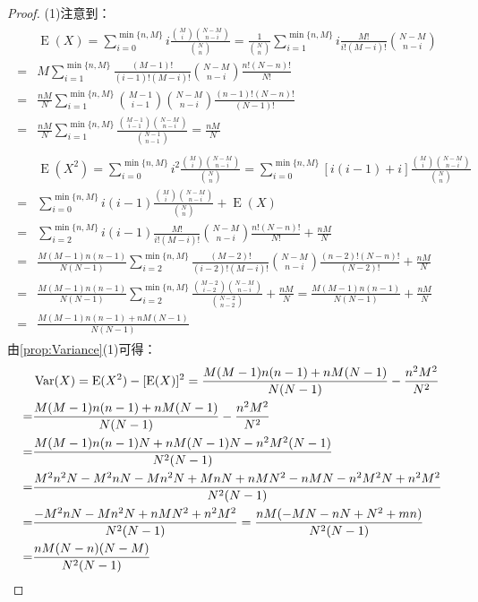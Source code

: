 \begin{proof}
	(1)注意到：
	\begin{gather*}
		\begin{aligned}
			&\operatorname{E}(X)=\sum_{i=0}^{\min\{n,M\}}i\frac{\binom{M}{i}\binom{N-M}{n-i}}{\binom{N}{n}}=\frac{1}{\binom{N}{n}}\sum_{i=1}^{\min\{n,M\}}i\frac{M!}{i!(M-i)!}\binom{N-M}{n-i} \\
			=&M\sum_{i=1}^{\min\{n,M\}}\frac{(M-1)!}{(i-1)!(M-i)!}\binom{N-M}{n-i}\frac{n!(N-n)!}{N!} \\
			=&\frac{nM}{N}\sum_{i=1}^{\min\{n,M\}}\binom{M-1}{i-1}\binom{N-M}{n-i}\frac{(n-1)!(N-n)!}{(N-1)!} \\
			=&\frac{nM}{N}\sum_{i=1}^{\min\{n,M\}}\frac{\binom{M-1}{i-1}\binom{N-M}{n-i}}{\binom{N-1}{n-1}}=\frac{nM}{N}
		\end{aligned} \\
		\begin{aligned}
			&\operatorname{E}(X^2)=\sum_{i=0}^{\min\{n,M\}}i^2\frac{\binom{M}{i}\binom{N-M}{n-i}}{\binom{N}{n}}=\sum_{i=0}^{\min\{n,M\}}[i(i-1)+i]\frac{\binom{M}{i}\binom{N-M}{n-i}}{\binom{N}{n}} \\
			=&\sum_{i=0}^{\min\{n,M\}}i(i-1)\frac{\binom{M}{i}\binom{N-M}{n-i}}{\binom{N}{n}}+\operatorname{E}(X) \\
			=&\sum_{i=2}^{\min\{n,M\}}i(i-1)\frac{M!}{i!(M-i)!}\binom{N-M}{n-i}\frac{n!(N-n)!}{N!}+\frac{nM}{N} \\
			=&\frac{M(M-1)n(n-1)}{N(N-1)}\sum_{i=2}^{\min\{n,M\}}\frac{(M-2)!}{(i-2)!(M-i)!}\binom{N-M}{n-i}\frac{(n-2)!(N-n)!}{(N-2)!}+\frac{nM}{N} \\
			=&\frac{M(M-1)n(n-1)}{N(N-1)}\sum_{i=2}^{\min\{n,M\}}\frac{\binom{M-2}{i-2}\binom{N-M}{n-i}}{\binom{N-2}{n-2}}+\frac{nM}{N}=\frac{M(M-1)n(n-1)}{N(N-1)}+\frac{nM}{N} \\
			=&\frac{M(M-1)n(n-1)+nM(N-1)}{N(N-1)}
		\end{aligned}
	\end{gather*}
	由\cref{prop:Variance}(1)可得：
	\begin{align*}
		&\operatorname{Var}(X)=\operatorname{E}(X^2)-[\operatorname{E}(X)]^2=\frac{M(M-1)n(n-1)+nM(N-1)}{N(N-1)}-\frac{n^2M^2}{N^2} \\
		=&\frac{M(M-1)n(n-1)+nM(N-1)}{N(N-1)}-\frac{n^2M^2}{N^2} \\
		=&\frac{M(M-1)n(n-1)N+nM(N-1)N-n^2M^2(N-1)}{N^2(N-1)} \\
		=&\frac{M^2n^2N-M^2nN-Mn^2N+MnN+nMN^2-nMN-n^2M^2N+n^2M^2}{N^2(N-1)} \\
		=&\frac{-M^2nN-Mn^2N+nMN^2+n^2M^2}{N^2(N-1)}=\frac{nM(-MN-nN+N^2+mn)}{N^2(N-1)} \\
		=&\frac{nM(N-n)(N-M)}{N^2(N-1)}\qedhere
	\end{align*}
\end{proof}

